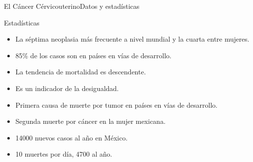 \documentclass{beamer}
\begin{document}
    \begin{frame}{El Cáncer Cérvicouterino}{Datos y estadísticas}
        \begin{block}{Estadísticas}{
            \begin{itemize}
                \item La séptima neoplasia más frecuente a nivel mundial y la cuarta entre mujeres.
                \item 85\% de los casos son en países en vías de desarrollo.
                \item La tendencia de mortalidad es descendente.
                \item Es un indicador de la desigualdad.
                \item Primera causa de muerte por tumor en países en vías de desarrollo.
                \item Segunda muerte por cáncer en la mujer mexicana.
                \item 14000 nuevos casos al año en México.
                \item 10 muertes por día, 4700 al año.
            \end{itemize}
        }
        \end{block}
    \end{frame}
\end{document}
